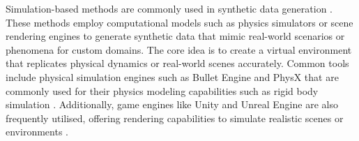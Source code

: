 \documentclass[preprint,12pt]{elsarticle}
\begin{document}
Simulation-based methods are commonly used in synthetic data generation \citep{demelo2022nextgeneration}.
These methods employ computational models such as physics simulators or scene rendering engines to generate synthetic data that mimic real-world scenarios or phenomena for custom domains. 
The core idea is to create a virtual environment that replicates physical dynamics or real-world scenes accurately.
Common tools include physical simulation engines such as Bullet Engine \citep{coumans2021pybullet} and PhysX \citep{nvidia2024nvidia} that are commonly used for their physics modeling capabilities such as rigid body simulation \citep{greff2022kubricscalabledatasetgenerator}. 
Additionally, game engines like Unity \citep{unity2024unity} and Unreal Engine \citep{unreal2024epic} are also frequently utilised, offering rendering capabilities to simulate realistic scenes or environments \citep{LEE2023105060, borkman2021unityperceptiongeneratesynthetic}.
\par
\end{document}
